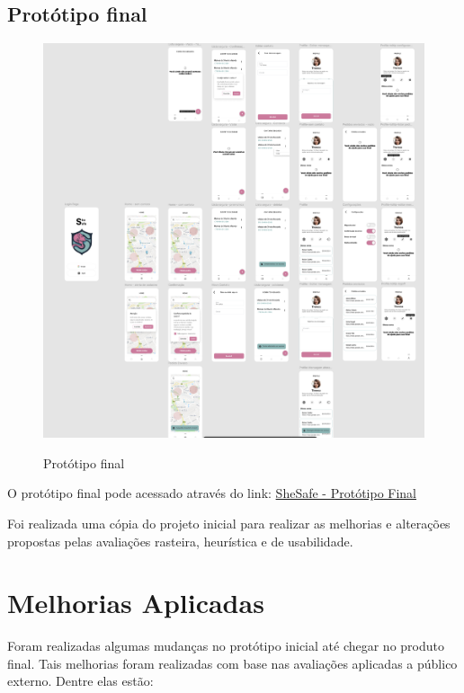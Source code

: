 \subsection{Protótipo final}
\begin{figure}[h]
	\begin{center}
		\includegraphics[width=0.7\linewidth]{images/prototipo-final.png}\\
	\end{center}
	\caption[Pr]{Protótipo final}
	\label{fig:prototipo-final}
\end{figure}
\pagebreak
O protótipo final pode acessado através do link: \href{https://www.figma.com/proto/GALwTZKTsmvOVWX4JARmOB/SheSafe-Corrigido?node-id=26-653&viewport=2654%2C786%2C0.79&t=dkVCQTw83BbPw3KK-0&scaling=min-zoom&starting-point-node-id=26%3A653}{SheSafe - Protótipo Final}

Foi realizada uma cópia do projeto inicial para realizar as melhorias e alterações propostas pelas avaliações rasteira, heurística e de usabilidade.

\section{Melhorias Aplicadas}
Foram realizadas algumas mudanças no protótipo inicial até chegar no produto final. Tais melhorias foram realizadas com base nas avaliações aplicadas a público externo. Dentre elas estão:

